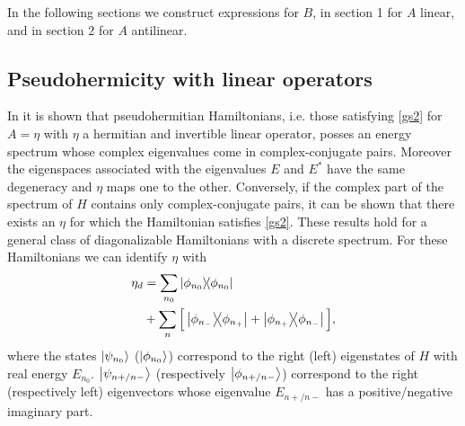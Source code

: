 In the following sections we construct expressions for $B$, in section 1 for $A$ linear, and in section 2 for $A$ antilinear.

\subsection{Pseudohermicity with linear operators\label{ContPseudoHermicity}}
%
In \cite{Mostafazadeh2002,Mostafazadeh2002a,Mostafazadeh2002b} it is shown that pseudohermitian Hamiltonians, i.e. those satisfying \eqref{gs2} for $A=\eta$ with $\eta$ a hermitian and invertible linear operator, posses an energy spectrum whose complex eigenvalues come in complex-conjugate pairs. Moreover the eigenspaces associated with  the eigenvalues $E$ and $E^*$ have the same degeneracy and $\eta$ maps one to the other. Conversely, if the complex part of the spectrum of $H$ contains only complex-conjugate pairs, it can be shown that there exists an $\eta$ for which the Hamiltonian satisfies \eqref{gs2}.
These results hold for a general class of diagonalizable Hamiltonians with a discrete spectrum. For these Hamiltonians we can identify $\eta$ with
%
\begin{equation}
    \begin{split}
    \eta_{d} &= \sum_{n_0} \ketbra{\phi_{n_0}}{\phi_{n_0}}\\ &+ \sum_n \Big[\ketbra{\phi_{n_-}}{\phi_{n_+}} +  \ketbra{\phi_{n_+}}{\phi_{n_-}}\Big],
    \end{split}
    \label{eq:DiscreteEta}
\end{equation}
%
%
%
where the states $\ket{\psi_{n_0}}$ ($\ket{\phi_{n_0}}$) correspond to the right (left) eigenstates of $H$ with real energy $E_{n_0}$.
$\ket{\psi_{n+/n-}}$  (respectively $\ket{\phi_{n+/n-}}$) correspond to the right (respectively left) eigenvectors whose eigenvalue $E_{n+/n-}$  has a positive/negative imaginary part.
